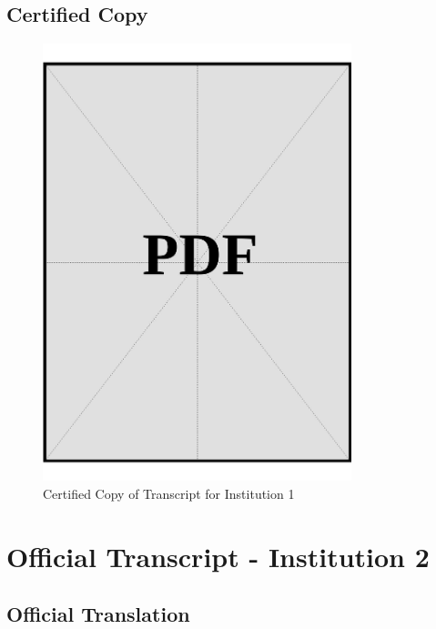 \clearpage

\subsection*{Certified Copy}
\vspace*{\fill}

\begin{figure}[h]
    \centering
    \includegraphics[page=1, width=0.8\textwidth]{../application-docs/applicant/post-secondary-institutions/institution-1/transcript/certified-copies.pdf}
    \caption{Certified Copy of Transcript for Institution 1}
    \label{fig:institution-1-transcript-certified-copy}
\end{figure}

\vspace*{\fill}
\clearpage


\section{Official Transcript - Institution 2}\label{sec:institution-2-transcript}

\subsection*{Official Translation}
\vspace*{\fill}

